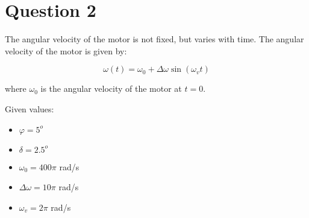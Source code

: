 \documentclass{article}
\begin{document}
\section*{Question 2}
The angular velocity of the motor is not fixed, but varies with time. 
The angular velocity of the motor is given by:

\begin{equation*}
\omega(t) = \omega_0 + \Delta \omega \sin(\omega_v t)
\end{equation*}

where $\omega_0$ is the angular velocity of the motor at $t=0$.

Given values:

\begin{itemize}
\item $\varphi  = 5^o$ 
\item $\delta = 2.5^o$
\item $\omega_0 = 400 \pi$ rad/s
\item $\Delta \omega = 10 \pi$ rad/s
\item $\omega_v = 2 \pi$ rad/s
\end{itemize}
\end{document}
